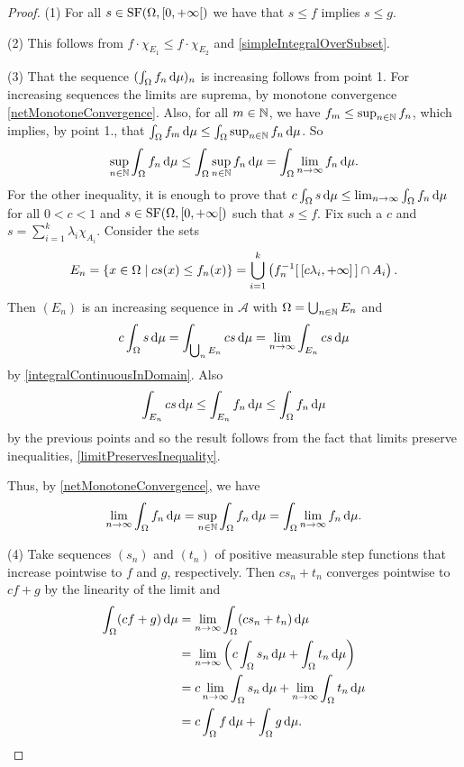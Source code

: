 \begin{proof}
(1) For all $s\in \SF(\Omega, \interval[co]{0,+\infty})$ we have that $s\leq f$ implies $s\leq g$.

(2) This follows from $f\cdot\chi_{E_1}\leq f\cdot\chi_{E_2}$ and \ref{simpleIntegralOverSubset}.

(3) That the sequence $(\int_\Omega f_n\operatorname{d \!}{\mu})_n$ is increasing follows from point 1. For increasing sequences the limits are suprema, by monotone convergence \ref{netMonotoneConvergence}. Also, for all $m\in\mathbb{N}$, we have $f_m\leq\sup_{n\in\mathbb{N}}f_n$, which implies, by point 1., that $\int_\Omega f_m\operatorname{d \!}{\mu}\leq \int_\Omega \sup_{n\in\mathbb{N}}f_n\operatorname{d \!}{\mu}$. So
\[ \sup_{n\in\mathbb{N}}\int_\Omega f_n\operatorname{d \!}{\mu} \leq \int_\Omega \sup_{n\in\mathbb{N}}f_n\operatorname{d \!}{\mu} = \int_\Omega \lim_{n\to\infty}f_n\operatorname{d \!}{\mu}. \]
For the other inequality, it is enough to prove that $c\int_\Omega s\operatorname{d \!}{\mu} \leq \lim_{n\to\infty}\int_\Omega f_n\operatorname{d \!}{\mu}$ for all $0<c<1$ and $s\in\operatorname{SF}(\Omega,[0,+\infty[)$ such that $s\leq f$. Fix such a $c$ and $s = \sum_{i=1}^k\lambda_i\chi_{A_i}$. Consider the sets
\[ E_n = \setbuilder{x\in\Omega}{cs(x)\leq f_n(x)} = \bigcup_{i=1}^k \left(f^{-1}_n[\,[c\lambda_i, +\infty]\,]\cap A_i\right). \]
Then $(E_n)$ is an increasing sequence in $\mathcal{A}$ with $\Omega= \bigcup_{n\in\mathbb{N}}E_n$ and
\[ c\int_\Omega s\operatorname{d \!}{\mu} = \int_{\bigcup_n E_n} cs\operatorname{d \!}{\mu} = \lim_{n\to\infty}\int_{E_n} cs\operatorname{d \!}{\mu} \]
by \ref{integralContinuousInDomain}. Also 
\[ \int_{E_n} cs\operatorname{d \!}{\mu} \leq \int_{E_n} f_n\operatorname{d \!}{\mu} \leq \int_{\Omega} f_n\operatorname{d \!}{\mu} \]
by the previous points and so the result follows from the fact that limits preserve inequalities, \ref{limitPreservesInequality}.

Thus, by \ref{netMonotoneConvergence}, we have
\[ \lim_{n\to\infty}\int_\Omega f_n\operatorname{d \!}{\mu} = \sup_{n\in\mathbb{N}}\int_\Omega f_n\operatorname{d \!}{\mu} = \int_\Omega \lim_{n\to\infty}f_n\operatorname{d \!}{\mu}. \]

(4) Take sequences $(s_n)$ and $(t_n)$ of positive measurable step functions
that increase pointwise to $f$ and $g$, respectively. Then $cs_n+t_n$ converges pointwise to $cf+g$ by the linearity of the limit and
\begin{align*}
\int_\Omega(cf+g)\diff{\mu} &= \lim_{n\to\infty}\int_\Omega(cs_n+t_n)\diff{\mu} \\
&= \lim_{n\to\infty}\left(c\int_\Omega s_n\diff{\mu}+\int_\Omega t_n\diff{\mu}\right) \\
&= c\lim_{n\to\infty}\int_\Omega s_n\diff{\mu}+\lim_{n\to\infty}\int_\Omega t_n\diff{\mu} \\
&= c\int_\Omega f\diff{\mu} + \int_\Omega g\diff{\mu}.
\end{align*}


\end{proof}
